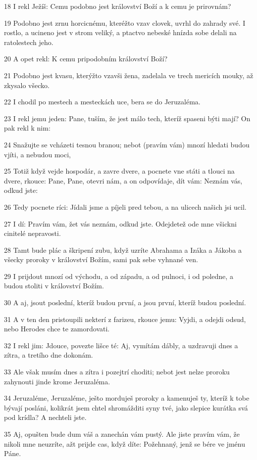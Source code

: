 \par 18 I rekl Ježíš: Cemu podobno jest království Boží a k cemu je prirovnám?
\par 19 Podobno jest zrnu horcicnému, kteréžto vzav clovek, uvrhl do zahrady své. I rostlo, a ucineno jest v strom veliký, a ptactvo nebeské hnízda sobe delali na ratolestech jeho.
\par 20 A opet rekl: K cemu pripodobním království Boží?
\par 21 Podobno jest kvasu, kterýžto vzavši žena, zadelala ve trech mericích mouky, až zkysalo všecko.
\par 22 I chodil po mestech a mesteckách uce, bera se do Jeruzaléma.
\par 23 I rekl jemu jeden: Pane, tuším, že jest málo tech, kteríž spaseni býti mají? On pak rekl k nim:
\par 24 Snažujte se vcházeti tesnou branou; nebot (pravím vám) mnozí hledati budou vjíti, a nebudou moci,
\par 25 Totiž když vejde hospodár, a zavre dvere, a pocnete vne státi a tlouci na dvere, rkouce: Pane, Pane, otevri nám, a on odpovídaje, dít vám: Neznám vás, odkud jste:
\par 26 Tedy pocnete ríci: Jídali jsme a píjeli pred tebou, a na ulicech našich jsi ucil.
\par 27 I dí: Pravím vám, žet vás neznám, odkud jste. Odejdetež ode mne všickni cinitelé nepravosti.
\par 28 Tamt bude plác a škripení zubu, když uzríte Abrahama a Izáka a Jákoba a všecky proroky v království Božím, sami pak sebe vyhnané ven.
\par 29 I prijdout mnozí od východu, a od západu, a od pulnoci, i od poledne, a budou stoliti v království Božím.
\par 30 A aj, jsout poslední, kteríž budou první, a jsou první, kteríž budou poslední.
\par 31 A v ten den pristoupili nekterí z farizeu, rkouce jemu: Vyjdi, a odejdi odsud, nebo Herodes chce te zamordovati.
\par 32 I rekl jim: Jdouce, povezte lišce té: Aj, vymítám dábly, a uzdravuji dnes a zítra, a tretího dne dokonám.
\par 33 Ale však musím dnes a zítra i pozejtrí choditi; nebot jest nelze proroku zahynouti jinde krome Jeruzaléma.
\par 34 Jeruzaléme, Jeruzaléme, ješto morduješ proroky a kamenuješ ty, kteríž k tobe bývají posláni, kolikrát jsem chtel shromážditi syny tvé, jako slepice kurátka svá pod krídla? A nechteli jste.
\par 35 Aj, opušten bude dum váš a zanechán vám pustý. Ale jiste pravím vám, že nikoli mne neuzríte, ažt prijde cas, když díte: Požehnaný, jenž se bére ve jménu Páne.

